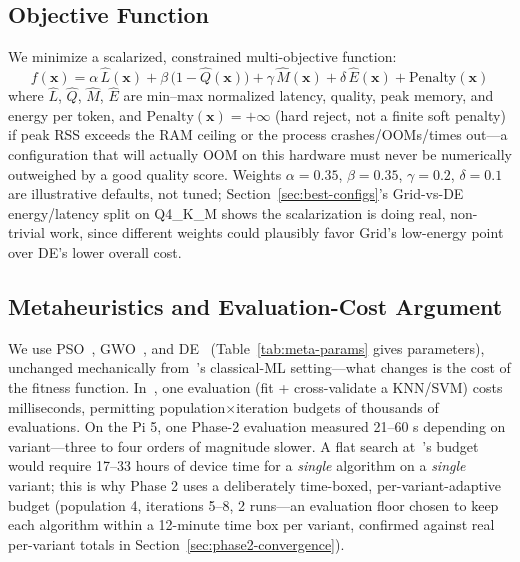 \documentclass[conference, letterpaper]{IEEEtran}
\begin{document}
\subsection{Objective Function}
\label{sec:objective}
We minimize a scalarized, constrained multi-objective function:
\begin{equation}
\label{eq:objective}
f(\mathbf{x}) = \alpha\,\hat{L}(\mathbf{x}) + \beta\,\bigl(1-\hat{Q}(\mathbf{x})\bigr) + \gamma\,\hat{M}(\mathbf{x}) + \delta\,\hat{E}(\mathbf{x}) + \mathrm{Penalty}(\mathbf{x})
\end{equation}
where $\hat{L}$, $\hat{Q}$, $\hat{M}$, $\hat{E}$ are min--max normalized latency, quality, peak memory, and energy per token, and $\mathrm{Penalty}(\mathbf{x})=+\infty$ (hard reject, not a finite soft penalty) if peak RSS exceeds the RAM ceiling or the process crashes/OOMs/times out---a configuration that will actually OOM on this hardware must never be numerically outweighed by a good quality score. Weights $\alpha{=}0.35$, $\beta{=}0.35$, $\gamma{=}0.2$, $\delta{=}0.1$ are illustrative defaults, not tuned; Section~\ref{sec:best-configs}'s Grid-vs-DE energy/latency split on Q4\_K\_M shows the scalarization is doing real, non-trivial work, since different weights could plausibly favor Grid's low-energy point over DE's lower overall cost.

\subsection{Metaheuristics and Evaluation-Cost Argument}
\label{sec:cost-argument}
We use PSO~\cite{ref8}, GWO~\cite{ref9}, and DE~\cite{ref10} (Table~\ref{tab:meta-params} gives parameters), unchanged mechanically from~\cite{ref11}'s classical-ML setting---what changes is the cost of the fitness function. In~\cite{ref11}, one evaluation (fit + cross-validate a KNN/SVM) costs milliseconds, permitting population$\times$iteration budgets of thousands of evaluations. On the Pi 5, one Phase-2 evaluation measured 21--60 s depending on variant---three to four orders of magnitude slower. A flat search at~\cite{ref11}'s budget would require 17--33 hours of device time for a \emph{single} algorithm on a \emph{single} variant; this is why Phase 2 uses a deliberately time-boxed, per-variant-adaptive budget (population 4, iterations 5--8, 2 runs---an evaluation floor chosen to keep each algorithm within a 12-minute time box per variant, confirmed against real per-variant totals in Section~\ref{sec:phase2-convergence}).
\end{document}
